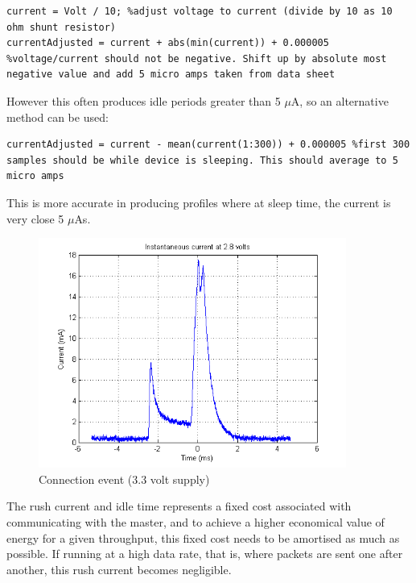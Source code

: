 \documentclass[]{article}
\begin{document}
\begin{lstlisting}
current = Volt / 10; %adjust voltage to current (divide by 10 as 10 ohm shunt resistor)
currentAdjusted = current + abs(min(current)) + 0.000005 %voltage/current should not be negative. Shift up by absolute most negative value and add 5 micro amps taken from data sheet
\end{lstlisting}

However this often produces idle periods greater than 5 $\mu$A, so an alternative method can be used:

\begin{lstlisting}
currentAdjusted = current - mean(current(1:300)) + 0.000005 %first 300 samples should be while device is sleeping. This should average to 5 micro amps
\end{lstlisting}

This is more accurate in producing profiles where at sleep time, the current is very close 5 $\mu$As.

\begin{figure}[H]
	\begin{center}
		\includegraphics[width = 0.9\textwidth]{icur28}
	\end{center}
	\caption{Connection event (3.3 volt supply)}
	\label{fig:icur2.8}
\end{figure}

 The rush current and idle time represents a fixed cost associated with communicating with the master, and to achieve a higher economical value of energy for a given throughput, this fixed cost needs to be amortised as much as possible. If running at a high data rate, that is, where packets are sent one after another, this rush current becomes negligible.  
\end{document}
